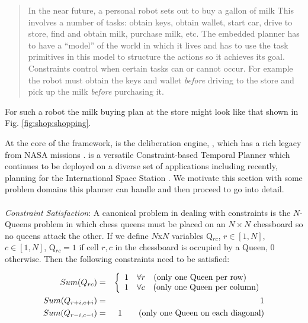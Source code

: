{\small
  \begin{quote}
    In the near future, a personal robot sets out to buy a gallon of
    milk This involves a number of tasks: obtain keys, obtain wallet,
    start car, drive to store, find and obtain milk, purchase milk,
    etc.  The embedded planner has to have a ``model'' of the world in
    which it lives and has to use the task primitives in this model to
    structure the actions so it achieves its goal. Constraints control
    when certain tasks can or cannot occur. For example the robot must
    obtain the keys and wallet \emph{before} driving to the store and
    pick up the milk \emph{before} purchasing it.
\end{quote}

For such a robot the milk buying plan at the store might look like
that shown in Fig. \ref{fig:shop:shopping}.

At the core of the \rx framework, is the deliberation engine, \eue,
which has a rich legacy from NASA missions \cite{mus98,rajan00,
  jonsson00,aichang04, bresina05}. \eu is a versatile Constraint-based
Temporal Planner which continues to be deployed on a diverse set of
applications including recently, planning for the International Space
Station \cite{barreiro09}. We motivate this section with some problem
domains this planner can handle and then proceed to go into detail.

\paragraph{} {\em Constraint Satisfaction}: A canonical problem in
dealing with constraints is the $N$-Queens problem in which chess queens
must be placed on an  $N \times N$ chessboard so no queens attack the other. %
If we define $N$x$N$ variables Q$_{rc}$, $r \in [1,N]$, $c \in [1,N]$,
Q$_{rc} = 1$ if cell $r,c$ in the chessboard is occupied by a Queen,
$0$ otherwise. Then the following constraints need to be satisfied:

\begin{eqnarray*}
 Sum(Q_{rc}) & = & \left\{
   \begin{array}{l l}
     1 & \forall r \quad \mbox{(only one Queen per row)}\\
     1 & \forall c \quad \mbox{(only one Queen per column)}\\ 
   \end{array} \right. \\
Sum(Q_{r+i,c+i}) & = & 1\\
Sum(Q_{r-i,c-i}) & = & 1 \qquad \mbox{(only one Queen on each diagonal)}\\
\end{eqnarray*} 

}
